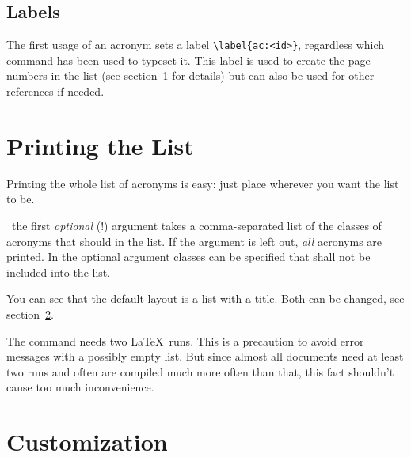 \documentclass[DIV10,toc=index,toc=bib]{cnpkgdoc}
\begin{document}
\subsection{Labels}
The first usage of an acronym sets a label \verb+\label{ac:<id>}+, regardless
which command has been used to typeset it. This label is used to create the page
numbers in the list (see section~\ref{sec:print_lists} for details) but can also
be used for other references if needed.

\section{Printing the List}\label{sec:print_lists}
Printing the whole list of acronyms is easy: just place 
wherever you want the list to be.
\begin{beschreibung}
  \cnpkgdocarrow\
 the first \emph{optional} (!) argument  takes a comma-separated
 list of the classes of acronyms that should in the list. If the argument is left
 out, \emph{all} acronyms are printed. In the optional argument \oa{<excluded
 classes>} classes can be specified that shall not be included into the list.
\end{beschreibung}
\begin{beispiel}[below]
 \printacronyms[city]
\end{beispiel}
You can see that the default layout is a  list with a
\code{section*} title. Both can be changed, see section~\ref{sec:customization}.

The command  needs two \LaTeX\ runs. This is a precaution to
avoid error messages with a possibly empty list. But since almost all documents
need at least two runs and often are compiled much more often than that, this
fact shouldn't cause too much inconvenience.

\section{Customization}\label{sec:customization}
\end{document}
